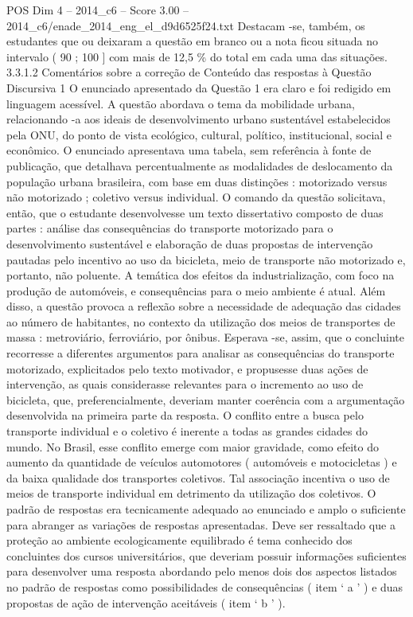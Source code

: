 \begin{textsample}{POS Dim 4 – 2014\_c6 – Score 3.00 – 2014\_c6/enade\_2014\_eng\_el\_d9d6525f24.txt}
Destacam -se, também, os estudantes que ou deixaram a questão em branco ou a nota ficou situada no intervalo ( 90 ; 100 ] com mais de 12,5 \% do total em cada uma das situações. 3.3.1.2 Comentários sobre a correção de Conteúdo das respostas à Questão Discursiva 1 O enunciado apresentado da Questão 1 era claro e foi redigido em linguagem acessível.
A questão abordava o tema da mobilidade urbana, relacionando -a aos ideais de desenvolvimento urbano sustentável estabelecidos pela ONU, do ponto de vista ecológico, cultural, político, institucional, social e econômico.
O enunciado apresentava uma tabela, sem referência à fonte de publicação, que detalhava percentualmente as modalidades de deslocamento da população urbana brasileira, com base em duas distinções : motorizado versus não motorizado ; coletivo versus individual.
O comando da questão solicitava, então, que o estudante desenvolvesse um texto dissertativo composto de duas partes : análise das consequências do transporte motorizado para o desenvolvimento sustentável e elaboração de duas propostas de intervenção pautadas pelo incentivo ao uso da bicicleta, meio de transporte não motorizado e, portanto, não poluente.
A temática dos efeitos da industrialização, com foco na produção de automóveis, e consequências para o meio ambiente é atual.
Além disso, a questão provoca a reflexão sobre a necessidade de adequação das cidades ao número de habitantes, no contexto da utilização dos meios de transportes de massa : metroviário, ferroviário, por ônibus.
Esperava -se, assim, que o concluinte recorresse a diferentes argumentos para analisar as consequências do transporte motorizado, explicitados pelo texto motivador, e propusesse duas ações de intervenção, as quais considerasse relevantes para o incremento ao uso de bicicleta, que, preferencialmente, deveriam manter coerência com a argumentação desenvolvida na primeira parte da resposta.
O conflito entre a busca pelo transporte individual e o coletivo é inerente a todas as grandes cidades do mundo.
No Brasil, esse conflito emerge com maior gravidade, como efeito do aumento da quantidade de veículos automotores ( automóveis e motocicletas ) e da baixa qualidade dos transportes coletivos.
Tal associação incentiva o uso de meios de transporte individual em detrimento da utilização dos coletivos.
O padrão de respostas era tecnicamente adequado ao enunciado e amplo o suficiente para abranger as variações de respostas apresentadas.
Deve ser ressaltado que a proteção ao ambiente ecologicamente equilibrado é tema conhecido dos concluintes dos cursos universitários, que deveriam possuir informações suficientes para desenvolver uma resposta abordando pelo menos dois dos aspectos listados no padrão de respostas como possibilidades de consequências ( item ‘ a ’ ) e duas propostas de ação de intervenção aceitáveis ( item ‘ b ’ ).

\end{textsample}
